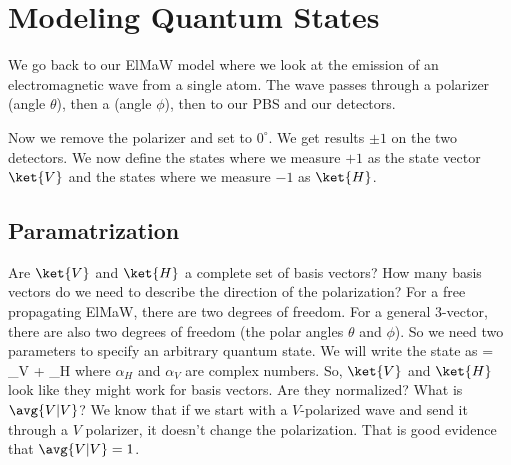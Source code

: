 \section{Modeling Quantum States}

We go back to our ElMaW model where we look at the emission of an electromagnetic wave from a single atom. The wave passes through a polarizer (angle $\theta$), then a \hwp (angle $\phi$), then to our PBS and our detectors.
\begin{marginfigure}\centering
{}
\end{marginfigure}
Now we remove the polarizer and set \hwp to $0^\circ$. We get results ${\pm 1}$ on the two detectors. We now define the states where we measure ${+1}$ as the state vector $\ket{V}$ and the states where we measure ${-1}$ as $\ket{H}$.

\subsection{Paramatrization}

Are $\ket{V}$ and $\ket{H}$ a complete set of basis vectors? How many basis vectors do we need to describe the direction of the polarization? For a free propagating ElMaW, there are two degrees of freedom. For a general 3-vector, there are also two degrees of freedom (the polar angles $\theta$ and $\phi$). So we need two parameters to specify an arbitrary quantum state. We will write the state as
\beq
{} = \alpha_V + \alpha_H
\label{eq:adecomp}
\eeq{}%
where $\alpha_H$ and $\alpha_V$ are complex numbers.  So, $\ket{V}$ and $\ket{H}$ look like they might work for basis vectors. Are they normalized? What is $\avg{V|V}$? We know that if we start with a $V$-polarized wave and send it through a $V$ polarizer, it doesn't change the polarization. That is good evidence that $\avg{V|V}=1$. 

